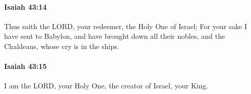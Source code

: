 		\paragraph{Isaiah 43:14} %
			\label{ISAIAH-43-14}

			Thus saith the LORD, your redeemer, the Holy One of Israel; For your sake I have sent to Babylon, and have brought down all their nobles, and the Chaldeans, whose cry is in the ships.


		\paragraph{Isaiah 43:15} %
			\label{ISAIAH-43-15}

			I am the LORD, your Holy One, the creator of Israel, your King.


